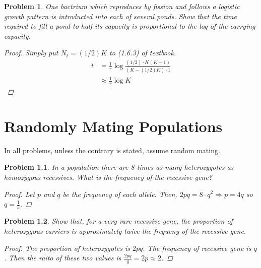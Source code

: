 \documentclass[12pt]{report}
\newtheorem{problem}{Problem}[chapter]
\begin{document}
        \begin{problem}
            One bactrium which reproduces by fission and follows a logistic growth pattern is introducted into each of several ponds.
            Show that the time required to fill a pond to half its capacity is proportional to the log of the carrying capacity.
            \begin{proof}
                Simply put $N_t=(1/2)K$ to (1.6.3) of textbook.
               \begin{equation*}
                   \begin{split}
                       t &= \frac{1}{r} \log \frac{(1/2)\cdot K(K-1)}{(K-(1/2)K)\cdot 1} \\
                         &\approx \frac{1}{r} \log{K}
                   \end{split}
               \end{equation*}

            \end{proof}
        \end{problem}

        \newpage

        \chapter{Randomly Mating Populations}
        In all problems, unless the contrary is stated, assume random mating.
        \begin{problem}
            In a population there are 8 times as many heterozygotes as homozygous recessives. 
            What is the frequency of the recessive gene?
            \begin{proof}
                Let $p$ and $q$ be the frequency of each allele.
                Then, $2pq = 8 \cdot q^2 \Rightarrow p=4q$ so $q=\frac{1}{5}$.
            \end{proof}
        \end{problem}

        \begin{problem}
            Show that, for a very rare recessive gene, the proportion of heterozygous carriers is approximately twice the frequeny of the recessive gene.
            \begin{proof}
                The proportion of heterozygotes is $2pq$. The frequency of recessive gene is $q$.
                Then the raito of these two values is $\frac{2pq}{q} = 2p \approx 2$.
            \end{proof}                
        \end{problem}
\end{document}
